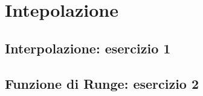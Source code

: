 \setchapterpreamble[u]{\margintoc}
\chapter{Intepolazione}

\section{Interpolazione: esercizio 1}

\section{Funzione di Runge: esercizio 2}

